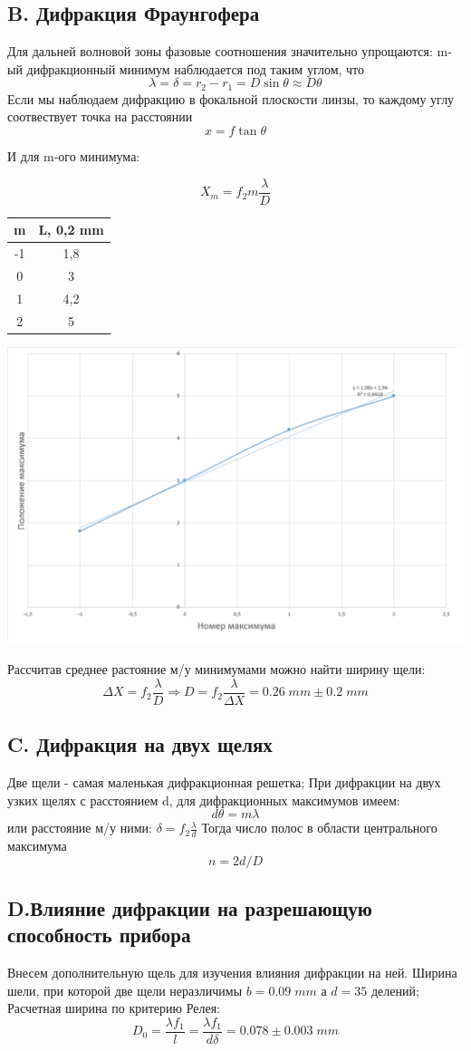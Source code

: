 \documentclass[12pt,a4paper]{article}
\begin{document}
\subsection{B. Дифракция Фраунгофера}
Для дальней волновой зоны фазовые соотношения значительно упрощаются: m-ый дифракционный минимум наблюдается под таким углом, что
\[ \lambda = \delta = r_2 - r_1 = D \sin \theta\approx D\theta\]
Если мы наблюдаем дифракцию в фокальной плоскости линзы, то каждому углу соотвествует точка на расстоянии \[x = f \tan \theta\]

И для m-ого минимума:

\[X_m = f_2 m \frac{\lambda}{D} \]
\begin{center}
\begin{tabular}{|c|c|}
\hline 
m & L, 0,2 mm\\ 
\hline 
-1 & 1,8 \\ 
\hline 
0 & 3 \\ 
\hline 
1 & 4,2 \\ 
\hline 
2 & 5 \\ 
\hline 
\end{tabular} 

\includegraphics[scale=0.6]{451_2.png}
\end{center}
Рассчитав среднее растояние м/у минимумами можно найти ширину щели:
\[\Delta X = f_2 \frac{\lambda}{D} \Rightarrow D =  f_2 \frac{\lambda}{\Delta X } = 0.26 \; mm \pm  0.2 \; mm\]

\subsection{C. Дифракция на двух щелях}
Две щели - самая маленькая дифракционная решетка; При дифракции на двух узких щелях с расстоянием d, для дифракционных максимумов имеем:
\[d \theta = m \lambda \]
или расстояние м/у ними: $\delta = f_2 \frac{\lambda}{d}$ 
Тогда число полос в области центрального максимума
\[n = 2d/D \]
\subsection{D.Влияние дифракции на разрешающую способность прибора}
Внесем дополнительную щель для изучения влияния дифракции на ней. Ширина шели, при которой две щели неразличимы $b= 0.09 \; mm$ а $d = 35$ делений;
Расчетная ширина по критерию Релея:
\[D_0 = \frac{\lambda f_1}{l} = \frac{\lambda f_1}{d \delta} = 0.078 \pm 0.003 \; mm \]
\end{document}
